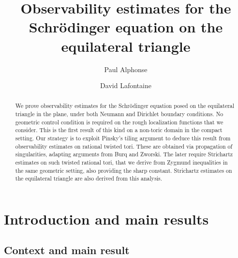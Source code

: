 \documentclass[a4paper,11pt]{amsart}
\date{}
\title[Observability estimates on the equilateral triangle]{Observability estimates for the Schr\"odinger equation on the equilateral triangle}
\author{Paul Alphonse}
\author{David Lafontaine}
\numberwithin{equation}{section}
\theoremstyle{definition}
\begin{document}
\begin{abstract} 
We prove observability estimates for the Schr\"odinger equation 
posed on the equilateral triangle in the plane, under both Neumann and Dirichlet boundary conditions. No geometric control condition is required on the rough localization functions that we consider. This is the first result of this kind on a non-toric domain in the compact setting. Our strategy is to exploit Pinsky's tiling argument to deduce this result from observability estimates on rational twisted tori. These are obtained via propagation of singularities, adapting arguments from Burq and Zworski. The later require Strichartz estimates on such twisted rational tori, that we derive from Zygmund inequalities in the same geometric setting, also providing the sharp constant. Strichartz estimates on the equilateral triangle are also derived from this analysis.
\end{abstract}

\sloppy


\maketitle

\section{Introduction and main results}

\subsection{Context and main result}
\end{document}
